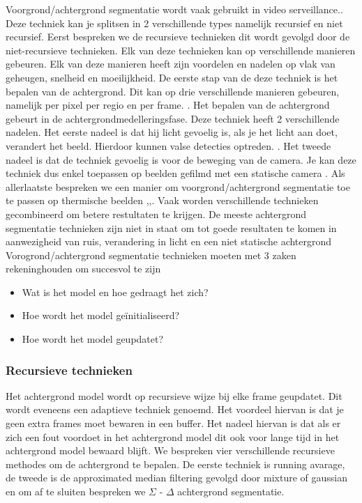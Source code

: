 Voorgrond/achtergrond segmentatie wordt vaak gebruikt in video serveillance.\cite{bibBET3}. Deze techniek kan je splitsen in 2 verschillende types namelijk recursief en niet recursief. Eerst bespreken we de recursieve technieken dit wordt gevolgd door de niet-recursieve technieken. Elk van deze technieken kan op verschillende manieren gebeuren. Elk van deze manieren heeft zijn voordelen en nadelen op vlak van geheugen, snelheid en moeilijkheid. De eerste stap van de deze techniek is het bepalen van de achtergrond. Dit kan op drie verschillende manieren gebeuren, namelijk per pixel per regio en per frame. \cite{bibBET4}.  Het bepalen  van de achtergrond gebeurt in de achtergrondmedelleringsfase. Deze techniek heeft 2 verschillende nadelen. Het eerste nadeel is dat hij licht gevoelig is, als je het licht aan doet, verandert het beeld. Hierdoor kunnen valse detecties optreden.  \cite{bibBET4}. Het tweede nadeel is dat de techniek gevoelig is voor de beweging van de camera. Je kan deze techniek dus enkel toepassen op beelden gefilmd met een statische camera \cite{bibBET7}. Als allerlaatste bespreken we een manier om voorgrond/achtergrond segmentatie toe te passen op thermische beelden \cite{bibBET5},\cite{bibBEt},\cite{bibBET2}. Vaak worden verschillende technieken gecombineerd om betere restultaten te krijgen. De meeste achtergrond segmentatie technieken  zijn niet in staat om tot goede resultaten te komen in aanwezigheid van ruis, verandering in licht en een niet statische achtergrond \cite{bibBET9}\\
 Vorogrond/achtergrond segmentatie technieken moeten met 3 zaken rekeninghouden om succesvol te zijn
 \begin{itemize}
 	\item Wat is het model en hoe gedraagt het zich?
 	\item Hoe wordt het model ge\"initialiseerd?
 	\item Hoe wordt het model geupdatet?
 \end{itemize}
 \cite{bibBET8}

\subsubsection{Recursieve technieken}
\label{refRT}
Het achtergrond model wordt op recursieve wijze bij elke frame geupdatet. Dit wordt eveneens een adaptieve techniek genoemd.  Het voordeel hiervan is dat je geen extra frames moet bewaren in een buffer. Het nadeel hiervan is dat als er zich een fout voordoet in het achtergrond model dit ook voor lange tijd in het achtergrond model bewaard blijft. We bespreken vier verschillende recursieve methodes om de achtergrond te bepalen. De eerste techniek is running avarage,  de tweede is de approximated median filtering gevolgd door mixture of gaussian en om af te sluiten bespreken we $\Sigma$ - $\Delta$ achtergrond segmentatie.

